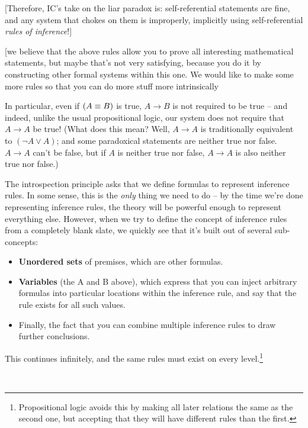 \documentclass{article}
\begin{document}
  [Therefore, IC's take on the liar paradox is: self-referential statements are fine, and any system that chokes on them is improperly, implicitly using self-referential \emph{rules of inference}!]
  
  
  
  [we believe that the above rules allow you to prove all interesting mathematical statements, but maybe that's not very satisfying, because you do it by constructing other formal systems within this one. We would like to make some more rules so that you can do more stuff more intrinsically
  
  
    
  In particular, even if $(A \equiv B)$ is true, $A \to B$ is not required to be true – and indeed, unlike the usual propositional logic, our system does not require that $A \to A$ be true! (What does this mean? Well, $A \to A$ is traditionally equivalent to $(\neg A \vee A)$; and some paradoxical statements are neither true nor false. $A \to A$ can't be false, but if $A$ is neither true nor false, $A \to A$ is also neither true nor false.)
  

  
  The introspection principle asks that we define formulas to represent inference rules.
  In some sense, this is the \emph{only} thing we need to do – by the time we're done representing inference rules, the theory will be powerful enough to represent everything else.
  However, when we try to define the concept of inference rules from a completely blank slate, we quickly see that it's built out of several sub-concepts:
  \begin{itemize}
    \item \textbf{Unordered sets} of premises, which are other formulas.
    \item \textbf{Variables} (the A and B above), which express that you can inject arbitrary formulas into particular locations within the inference rule, and say that the rule exists for all such values.
    \item Finally, the fact that you can combine multiple inference rules to draw further conclusions.
  \end{itemize}
    
  
  This continues infinitely, and the same rules must exist on every level.\footnote{Propositional logic avoids this by making all later relations the same as the second one, but accepting that they will have different rules than the first.}
  
  \\
  
\end{document}
